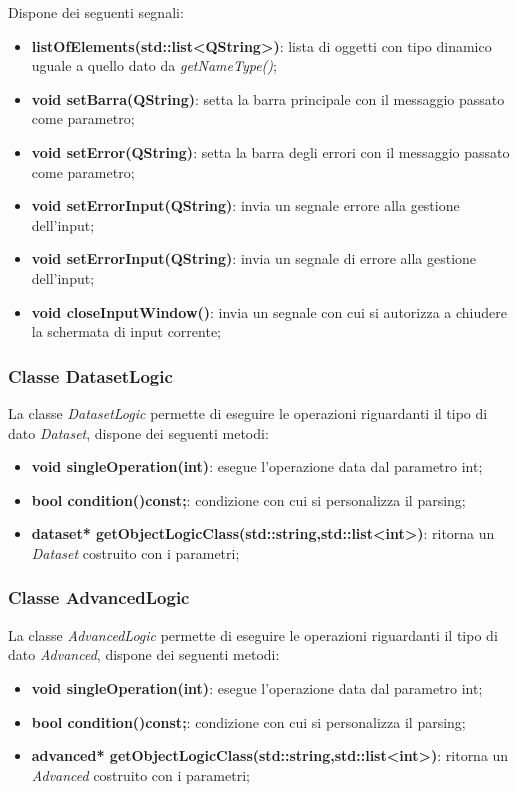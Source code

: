 \documentclass[a4paper,10pt]{article}
\begin{document}
        Dispone dei seguenti segnali:
        \begin{itemize}
            \item \textbf{listOfElements(std::list<QString>)}: lista di oggetti con tipo dinamico uguale a quello dato da \textit{getNameType()};
            \item \textbf{void setBarra(QString)}: setta la barra principale con il messaggio passato come parametro;
            \item \textbf{void setError(QString)}: setta la barra degli errori con il messaggio passato come parametro;
            \item \textbf{void setErrorInput(QString)}: invia un segnale errore alla gestione dell'input;
            \item \textbf{void setErrorInput(QString)}: invia un segnale di errore alla gestione dell'input;
            \item \textbf{void closeInputWindow()}: invia un segnale con cui si autorizza a chiudere la schermata di input corrente;
        \end{itemize}

        \subsubsection{Classe DatasetLogic}
        La classe \textit{DatasetLogic} permette di eseguire le operazioni riguardanti il tipo di dato \textit{Dataset}, dispone dei seguenti metodi:
        \begin{itemize}
            \item \textbf{void singleOperation(int)}: esegue l'operazione data dal parametro int;
            \item \textbf{bool condition()const;}: condizione con cui si personalizza il parsing;
            \item \textbf{dataset* getObjectLogicClass(std::string,std::list<int>)}: ritorna un \textit{Dataset} costruito con i parametri;
        \end{itemize}

        \subsubsection{Classe AdvancedLogic}
        La classe \textit{AdvancedLogic} permette di eseguire le operazioni riguardanti il tipo di dato \textit{Advanced}, dispone dei seguenti metodi:
        \begin{itemize}
            \item \textbf{void singleOperation(int)}: esegue l'operazione data dal parametro int;
            \item \textbf{bool condition()const;}: condizione con cui si personalizza il parsing;
            \item \textbf{advanced* getObjectLogicClass(std::string,std::list<int>)}: ritorna un \textit{Advanced} costruito con i parametri;
        \end{itemize}
\end{document}
